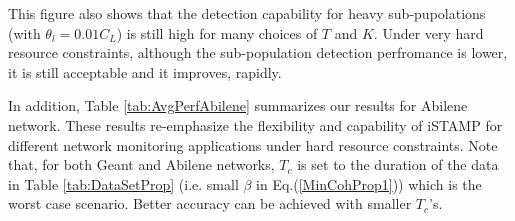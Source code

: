 This figure also shows that the detection capability for heavy sub-pupolations (with $\theta_{l} = 0.01 C_{L}$) is still high for many choices of $T$ and $K$. Under very hard resource constraints, although the sub-population detection perfromance is lower, it is still acceptable and it improves, rapidly. 

In addition, Table \ref{tab:AvgPerfAbilene} summarizes our results for Abilene network. These results re-emphasize the flexibility and capability of iSTAMP for different network monitoring applications under hard resource constraints. Note that, for both Geant and Abilene networks, $T_{c}$ is set to the duration of the data in Table \ref{tab:DataSetProp} (i.e. small $\beta$ in Eq.(\ref{MinCohProp1})) which is the worst case scenario. Better accuracy can be achieved with smaller $T_{c}$'s.

